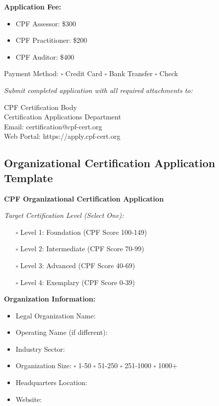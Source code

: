 \documentclass[11pt,a4paper]{article}
\begin{document}
\textbf{Application Fee:}
\begin{itemize}
\item CPF Assessor: \$300
\item CPF Practitioner: \$200
\item CPF Auditor: \$400
\end{itemize}

Payment Method: $\square$ Credit Card $\square$ Bank Transfer $\square$ Check

\textit{Submit completed application with all required attachments to:}

CPF Certification Body\\
Certification Applications Department\\
Email: certification@cpf-cert.org\\
Web Portal: https://apply.cpf-cert.org

\subsection{Organizational Certification Application Template}

\textbf{CPF Organizational Certification Application}

\textit{Target Certification Level (Select One):}
\begin{itemize}
\item[$\square$] Level 1: Foundation (CPF Score 100-149)
\item[$\square$] Level 2: Intermediate (CPF Score 70-99)
\item[$\square$] Level 3: Advanced (CPF Score 40-69)
\item[$\square$] Level 4: Exemplary (CPF Score 0-39)
\end{itemize}

\textbf{Organization Information:}
\begin{itemize}
\item Legal Organization Name: \underline{\hspace{10cm}}
\item Operating Name (if different): \underline{\hspace{10cm}}
\item Industry Sector: \underline{\hspace{10cm}}
\item Organization Size: $\square$ 1-50 $\square$ 51-250 $\square$ 251-1000 $\square$ 1000+
\item Headquarters Location: \underline{\hspace{10cm}}
\item Website: \underline{\hspace{10cm}}
\end{itemize}
\end{document}
